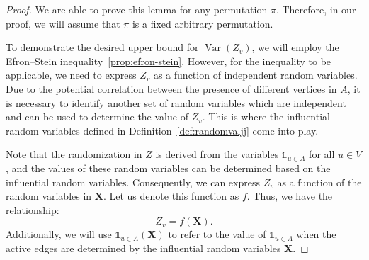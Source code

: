 \documentclass[letterpaper,11pt]{article}
\newcommand{\funcZ}[0]{f}
\DeclareMathOperator{\var}{Var}
\begin{document}
\newcommand{\gstar}{\ensuremath{\mathcal{G}}\xspace}

\begin{proof}
We are able to prove this lemma for any permutation $\pi$. Therefore, in our proof, we will assume that $\pi$ is a fixed arbitrary permutation.

To demonstrate the desired upper bound for $\var(Z_v)$, we will employ the Efron–Stein inequality~\ref{prop:efron-stein}. However, for the inequality to be applicable, we need to express $Z_v$ as a function of independent random variables.  Due to the potential correlation between the presence of different vertices in $A$, it is necessary to identify another set of  random variables which are independent and can be used to determine the value of $Z_v$. This is where the influential random variables defined in Definition~\ref{def:randomvaljj} come into play.


Note that the randomization in $Z$ is derived from the variables $\mathds{1}_{u\in A}$ for all $u\in V$, and the values of these random variables can be determined based on the influential random variables. Consequently, we can express $Z_v$ as a function of the random variables in $\bm{X}$. Let us denote this function as $\funcZ$. Thus, we have the relationship: 
$$Z_v =  \funcZ(\bm{X}).$$ Additionally, we will use $\mathds{1}_{u\in A}(\bm{X})$ to refer to the value of $\mathds{1}_{u\in A}$ when the active edges are determined by the influential random variables $\bm{X}$.
 

\end{proof}
\end{document}
